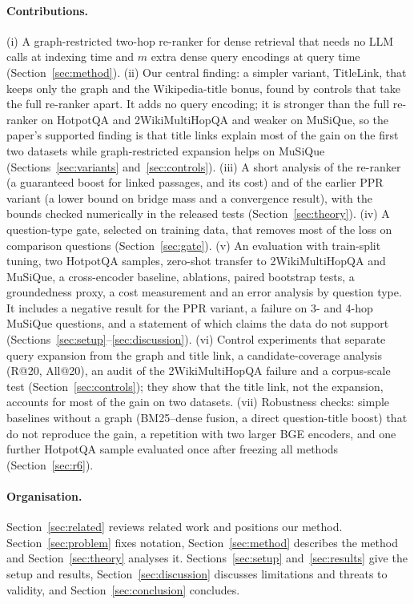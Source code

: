\documentclass[a4paper,fleqn]{cas-sc}
\begin{document}
\paragraph{Contributions.}
(i) A graph-restricted two-hop re-ranker for dense retrieval that needs no LLM calls at indexing time and $m$ extra dense query encodings at query time (Section~\ref{sec:method}).
(ii) Our central finding: a simpler variant, TitleLink, that keeps only the graph and the Wikipedia-title bonus, found by controls that take the full re-ranker apart. It adds no query encoding; it is stronger than the full re-ranker on HotpotQA and 2WikiMultiHopQA and weaker on MuSiQue, so the paper's supported finding is that title links explain most of the gain on the first two datasets while graph-restricted expansion helps on MuSiQue (Sections~\ref{sec:variants} and~\ref{sec:controls}).
(iii) A short analysis of the re-ranker (a guaranteed boost for linked passages, and its cost) and of the earlier PPR variant (a lower bound on bridge mass and a convergence result), with the bounds checked numerically in the released tests (Section~\ref{sec:theory}).
(iv) A question-type gate, selected on training data, that removes most of the loss on comparison questions (Section~\ref{sec:gate}).
(v) An evaluation with train-split tuning, two HotpotQA samples, zero-shot transfer to 2WikiMultiHopQA and MuSiQue, a cross-encoder baseline, ablations, paired bootstrap tests, a groundedness proxy, a cost measurement and an error analysis by question type. It includes a negative result for the PPR variant, a failure on 3- and 4-hop MuSiQue questions, and a statement of which claims the data do not support (Sections~\ref{sec:setup}--\ref{sec:discussion}).
(vi) Control experiments that separate query expansion from the graph and title link, a candidate-coverage analysis (R@20, All@20), an audit of the 2WikiMultiHopQA failure and a corpus-scale test (Section~\ref{sec:controls}); they show that the title link, not the expansion, accounts for most of the gain on two datasets.
(vii) Robustness checks: simple baselines without a graph (BM25--dense fusion, a direct question-title boost) that do not reproduce the gain, a repetition with two larger BGE encoders, and one further HotpotQA sample evaluated once after freezing all methods (Section~\ref{sec:r6}).

\paragraph{Organisation.} Section~\ref{sec:related} reviews related work and positions our method. Section~\ref{sec:problem} fixes notation, Section~\ref{sec:method} describes the method and Section~\ref{sec:theory} analyses it. Sections~\ref{sec:setup} and~\ref{sec:results} give the setup and results, Section~\ref{sec:discussion} discusses limitations and threats to validity, and Section~\ref{sec:conclusion} concludes.
\end{document}
